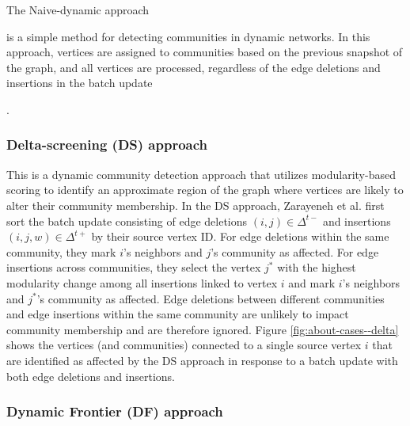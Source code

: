 The Naive-dynamic approach is a simple method for detecting communities in dynamic networks. In this approach, vertices are assigned to communities based on the previous snapshot of the graph, and all vertices are processed, regardless of the edge deletions and insertions in the batch update.


\subsubsection{Delta-screening (DS) approach \cite{com-zarayeneh21}}
\label{sec:delta-screening}

This is a dynamic community detection approach that utilizes modularity-based scoring to identify an approximate region of the graph where vertices are likely to alter their community membership. In the DS approach, Zarayeneh et al. first sort the batch update consisting of edge deletions $(i, j) \in \Delta^{t-}$ and insertions $(i, j, w) \in \Delta^{t+}$ by their source vertex ID. For edge deletions within the same community, they mark $i$'s neighbors and $j$'s community as affected. For edge insertions across communities, they select the vertex $j^*$ with the highest modularity change among all insertions linked to vertex $i$ and mark $i$'s neighbors and $j^*$'s community as affected. Edge deletions between different communities and edge insertions within the same community are unlikely to impact community membership and are therefore ignored. Figure \ref{fig:about-cases--delta} shows the vertices (and communities) connected to a single source vertex $i$ that are identified as affected by the DS approach in response to a batch update with both edge deletions and insertions.


\subsubsection{Dynamic Frontier (DF) approach \cite{sahu2024shared}}
\label{sec:about-frontier}

